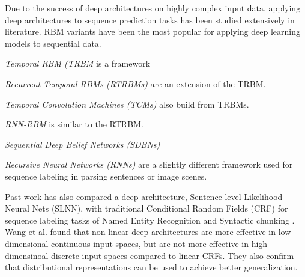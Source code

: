 Due to the success of deep architectures on highly complex input data, applying deep architectures to sequence prediction tasks has been studied extensively in literature. RBM variants have been the most popular for applying deep learning models to sequential data.

\emph{Temporal RBM (TRBM} \cite{sutskever06} is a framework


\emph{Recurrent Temporal RBMs (RTRBMs)} \cite{sutskever08} are an extension of the TRBM.


\emph{Temporal Convolution Machines (TCMs)} \cite{lockett09} also build from TRBMs.


\emph{RNN-RBM} \cite{lewandowski12} is similar to the RTRBM.


\emph{Sequential Deep Belief Networks (SDBNs)} \cite{andrew12, andrew13}


\emph{Recursive Neural Networks (RNNs)} \cite{socher11} are a slightly different framework used for sequence labeling in parsing sentences or image scenes.

Past work has also compared a deep architecture, Sentence-level Likelihood Neural Nets (SLNN), with traditional Conditional Random Fields (CRF) for sequence labeling tasks of Named Entity Recognition and Syntactic chunking \cite{wang13}. Wang et al. found that non-linear deep architectures are more effective in low dimensional continuous input spaces, but are not more effective in high-dimensinoal discrete input spaces compared to linear CRFs. They also confirm that distributional representations can be used to achieve better generalization.